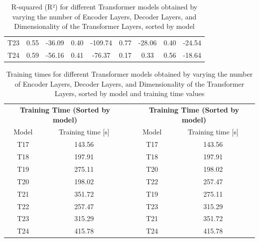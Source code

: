 \begin{table}[]
{\begin{tabular}{ccccccccc}
    T23   & \cellcolor[HTML]{FEE082}0.55 & \cellcolor[HTML]{FDD880}-36.09  & \cellcolor[HTML]{D1DE82}0.40 & \cellcolor[HTML]{FCB97A}-109.74 & \cellcolor[HTML]{76C47D}0.77  & \cellcolor[HTML]{FA9072}-28.06 & \cellcolor[HTML]{FCB77A}0.40 & \cellcolor[HTML]{FCC17C}-24.54 \\
    T24   & \cellcolor[HTML]{FEEA83}0.59 & \cellcolor[HTML]{FCBE7B}-56.16  & \cellcolor[HTML]{C2DA81}0.41 & \cellcolor[HTML]{FDCC7E}-76.37  & \cellcolor[HTML]{ECE683}0.17  & \cellcolor[HTML]{63BE7B}0.33   & \cellcolor[HTML]{FEDF81}0.56 & \cellcolor[HTML]{FDD17F}-18.64
    \end{tabular}%
    }
    \caption{R-squared (R²) for different Transformer models obtained by varying the number of Encoder Layers, Decoder Layers, and Dimensionality of the Transformer Layers, sorted by model}
    \label{T4_R}
    \end{table}



\begin{table}[]
    \begin{tabular}{ccccc}
    \multicolumn{2}{c}{\textbf{Training   Time (Sorted by model)}} &  & \multicolumn{2}{c}{\textbf{Training Time (Sorted   by model)}} \\
    Model             & Training time {[}s{]}                      &  & Model             & Training time {[}s{]}                      \\
    T17               & \cellcolor[HTML]{63BE7B}143.56             &  & T17               & \cellcolor[HTML]{63BE7B}143.56             \\
    T18               & \cellcolor[HTML]{A8D17E}197.91             &  & T18               & \cellcolor[HTML]{A8D17E}197.91             \\
    T19               & \cellcolor[HTML]{FFE483}275.11             &  & T20               & \cellcolor[HTML]{A8D17E}198.02             \\
    T20               & \cellcolor[HTML]{A8D17E}198.02             &  & T22               & \cellcolor[HTML]{F3E783}257.47             \\
    T21               & \cellcolor[HTML]{FBA176}351.72             &  & T19               & \cellcolor[HTML]{FFE483}275.11             \\
    T22               & \cellcolor[HTML]{F3E783}257.47             &  & T23               & \cellcolor[HTML]{FDC17C}315.29             \\
    T23               & \cellcolor[HTML]{FDC17C}315.29             &  & T21               & \cellcolor[HTML]{FBA176}351.72             \\
    T24               & \cellcolor[HTML]{F8696B}415.78             &  & T24               & \cellcolor[HTML]{F8696B}415.78            
    \end{tabular}
    \caption{Training times for different Transformer models obtained by varying the number of Encoder Layers, Decoder Layers, and Dimensionality of the Transformer Layers, sorted by model and training time values}
    \label{T4_T}
    \end{table}


